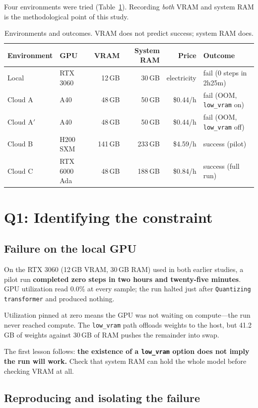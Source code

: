 \documentclass[10pt,twocolumn]{article}
\begin{document}
Four environments were tried (Table~\ref{tab:env}). Recording \emph{both} VRAM and system RAM is the methodological point of this study.

\begin{table}[t]
\centering\small
\caption{Environments and outcomes. VRAM does not predict success; system RAM does.}
\label{tab:env}
\begin{tabular}{llrrrl}
\toprule
Environment & GPU & VRAM & System RAM & Price & Outcome \\
\midrule
Local & RTX 3060 & 12\,GB & 30\,GB & electricity & fail (0 steps in 2h25m) \\
Cloud A & A40 & 48\,GB & 50\,GB & \$0.44/h & fail (OOM, \texttt{low\_vram} on) \\
Cloud A$'$ & A40 & 48\,GB & 50\,GB & \$0.44/h & fail (OOM, \texttt{low\_vram} off) \\
Cloud B & H200 SXM & 141\,GB & 233\,GB & \$4.59/h & success (pilot) \\
Cloud C & RTX 6000 Ada & 48\,GB & 188\,GB & \$0.84/h & success (full run) \\
\bottomrule
\end{tabular}
\end{table}

\section{Q1: Identifying the constraint}

\subsection{Failure on the local GPU}

On the RTX 3060 (12\,GB VRAM, 30\,GB RAM) used in both earlier studies, a pilot run \textbf{completed zero steps in two hours and twenty-five minutes}. GPU utilization read 0.0\% at every sample; the run halted just after \texttt{Quantizing transformer} and produced nothing.

Utilization pinned at zero means the GPU was not waiting on compute---the run never reached compute. The \texttt{low\_vram} path offloads weights to the host, but 41.2\,GB of weights against 30\,GB of RAM pushes the remainder into swap.

The first lesson follows: \textbf{the existence of a \texttt{low\_vram} option does not imply the run will work.} Check that system RAM can hold the whole model before checking VRAM at all.

\subsection{Reproducing and isolating the failure}
\end{document}
